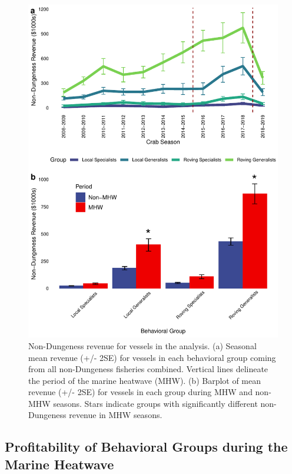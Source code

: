 \documentclass[]{elsarticle} %
\begin{document}
\begin{figure}%
\includegraphics[width=\linewidth]{fig_nondcrb_revenue.pdf}
\caption{Non-Dungeness revenue for vessels in the analysis. (a) Seasonal mean revenue (+/- 2SE) for vessels in each behavioral group coming from all non-Dungeness fisheries combined. Vertical lines delineate the period of the marine heatwave (MHW). (b) Barplot of mean revenue (+/- 2SE) for vessels in each group during MHW and non-MHW seasons. Stars indicate groups with significantly different non-Dungeness revenue in MHW seasons.}
\label{fig:revenue}
\end{figure}

\hypertarget{profitability-of-behavioral-groups-during-the-marine-heatwave}{%
\subsection{Profitability of Behavioral Groups during the Marine
Heatwave}\label{profitability-of-behavioral-groups-during-the-marine-heatwave}}
\end{document}
